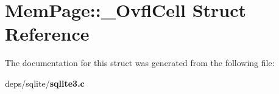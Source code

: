 \section{Mem\-Page::\_\-Ovfl\-Cell Struct Reference}
\label{structMemPage_1_1__OvflCell}


The documentation for this struct was generated from the following file:\begin{CompactItemize}
\item 
deps/sqlite/\bf{sqlite3.c}\end{CompactItemize}
